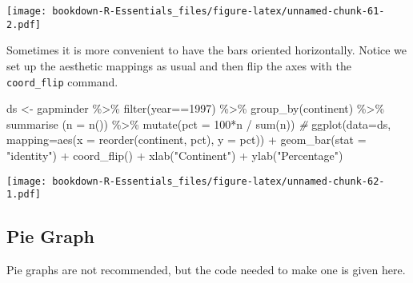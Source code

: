 \documentclass[
]{book}
\newenvironment{Shaded}{\begin{snugshade}}{\end{snugshade}}
\newcommand{\AttributeTok}[1]{\textcolor[rgb]{0.77,0.63,0.00}{#1}}
\newcommand{\CommentTok}[1]{\textcolor[rgb]{0.56,0.35,0.01}{\textit{#1}}}
\newcommand{\DecValTok}[1]{\textcolor[rgb]{0.00,0.00,0.81}{#1}}
\newcommand{\FunctionTok}[1]{\textcolor[rgb]{0.00,0.00,0.00}{#1}}
\newcommand{\NormalTok}[1]{#1}
\newcommand{\OtherTok}[1]{\textcolor[rgb]{0.56,0.35,0.01}{#1}}
\newcommand{\SpecialCharTok}[1]{\textcolor[rgb]{0.00,0.00,0.00}{#1}}
\newcommand{\StringTok}[1]{\textcolor[rgb]{0.31,0.60,0.02}{#1}}
\begin{document}
\texttt{[image: bookdown-R-Essentials\_files/figure-latex/unnamed-chunk-61-2.pdf]}

Sometimes it is more convenient to have the bars oriented horizontally. Notice we set up the aesthetic mappings as usual and then flip the axes with the \texttt{coord\_flip} command.

\begin{Shaded}
\begin{Highlighting}[]
\NormalTok{ds }\OtherTok{\textless{}{-}}\NormalTok{ gapminder }\SpecialCharTok{\%\textgreater{}\%} 
  \FunctionTok{filter}\NormalTok{(year}\SpecialCharTok{==}\DecValTok{1997}\NormalTok{) }\SpecialCharTok{\%\textgreater{}\%} 
  \FunctionTok{group\_by}\NormalTok{(continent)  }\SpecialCharTok{\%\textgreater{}\%}
  \FunctionTok{summarise}\NormalTok{ (}\AttributeTok{n =} \FunctionTok{n}\NormalTok{()) }\SpecialCharTok{\%\textgreater{}\%}
  \FunctionTok{mutate}\NormalTok{(}\AttributeTok{pct =} \DecValTok{100}\SpecialCharTok{*}\NormalTok{n }\SpecialCharTok{/} \FunctionTok{sum}\NormalTok{(n)) }
\CommentTok{\#}
\FunctionTok{ggplot}\NormalTok{(}\AttributeTok{data=}\NormalTok{ds, }\AttributeTok{mapping=}\FunctionTok{aes}\NormalTok{(}\AttributeTok{x =} \FunctionTok{reorder}\NormalTok{(continent, pct), }\AttributeTok{y =}\NormalTok{ pct)) }\SpecialCharTok{+} 
  \FunctionTok{geom\_bar}\NormalTok{(}\AttributeTok{stat =} \StringTok{"identity"}\NormalTok{) }\SpecialCharTok{+}
  \FunctionTok{coord\_flip}\NormalTok{() }\SpecialCharTok{+}
  \FunctionTok{xlab}\NormalTok{(}\StringTok{"Continent"}\NormalTok{) }\SpecialCharTok{+} \FunctionTok{ylab}\NormalTok{(}\StringTok{"Percentage"}\NormalTok{)}
\end{Highlighting}
\end{Shaded}

\texttt{[image: bookdown-R-Essentials\_files/figure-latex/unnamed-chunk-62-1.pdf]}

\hypertarget{pie-graph}{%
\subsection{Pie Graph}\label{pie-graph}}

Pie graphs are not recommended, but the code needed to make one is given here.
\end{document}
